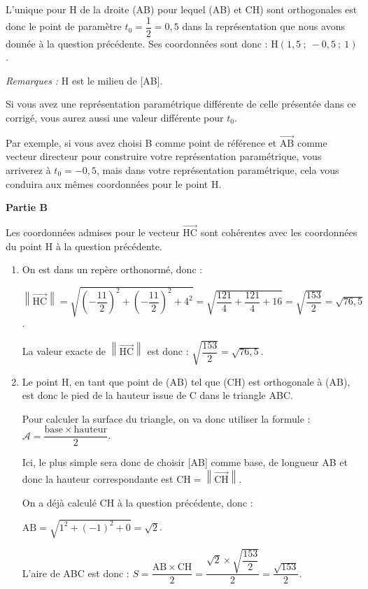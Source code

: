 \documentclass[10pt]{article}
\providecommand{\vect}[1]{\overrightarrow{#1}}
\begin{document}
\begin{enumerate}
L'unique pour H de la droite (AB) pour lequel (AB) et CH) sont orthogonales est donc le point de paramètre $t_0 = \dfrac{1}{2}=0,5$ dans la représentation que nous avons donnée à la question précédente. Ses coordonnées sont donc : H$(1,5 ~;~ -0,5 ~;~ 1)$.

\emph{Remarques :} H est le milieu de [AB].

Si vous avez une représentation paramétrique différente de celle présentée dans ce corrigé, vous aurez aussi une valeur différente pour $t_0$.

Par exemple, si vous avez choisi B comme point de référence et $\vect{\mathrm{AB}}$ comme vecteur directeur pour construire votre représentation paramétrique, vous arriverez à $t_0 = -0,5$, mais dans votre représentation paramétrique, cela vous conduira aux mêmes coordonnées pour le point H.
\end{enumerate}

\medskip

\textbf{Partie B}

\medskip
Les coordonnées admises pour le vecteur $\vect{\mathrm{HC}}$ sont cohérentes avec les coordonnées du point H à la question précédente.

\begin{enumerate}
	\item On est dans un repère orthonormé, donc :

	$\left\|\vect{\mathrm{HC}}\right\| = \sqrt{\left(-\dfrac{11}{2}\right)^2+\left(-\dfrac{11}{2}\right)^2+4^2 } = \sqrt{\dfrac{121}{4}+\dfrac{121}{4}+16} = \sqrt{\dfrac{153}{2}} = \sqrt{76,5}$.

	La valeur exacte de $\left\|\vect{\mathrm{HC}}\right\| $ est donc : $\sqrt{\dfrac{153}{2}} = \sqrt{76,5}$.

	\item Le point H, en tant que point de (AB) tel que (CH) est orthogonale à (AB), est donc le pied de la hauteur issue de C dans le triangle ABC.

Pour calculer la surface du triangle, on va donc utiliser la formule :\quad$\mathcal{A} = \dfrac{\mathrm{base}\times \mathrm{hauteur}}{2}$.

Ici, le plus simple sera donc de choisir [AB] comme base, de longueur AB et donc la hauteur correspondante est $\mathrm{CH} = \left\|\vect{\mathrm{CH}}\right\| $.

On a déjà calculé CH à la question précédente, donc :

$\mathrm{AB} = \sqrt{1^2 + (-1)^2 + 0} = \sqrt{2}$.

L'aire de ABC est donc : \quad$ S = \dfrac{\mathrm{AB}\times \mathrm{CH}}{2} = \dfrac{\sqrt{2} \times \sqrt{\dfrac{153}{2}}}{2} = \dfrac{\sqrt{153}}{2}$.
\end{enumerate}
\end{document}
